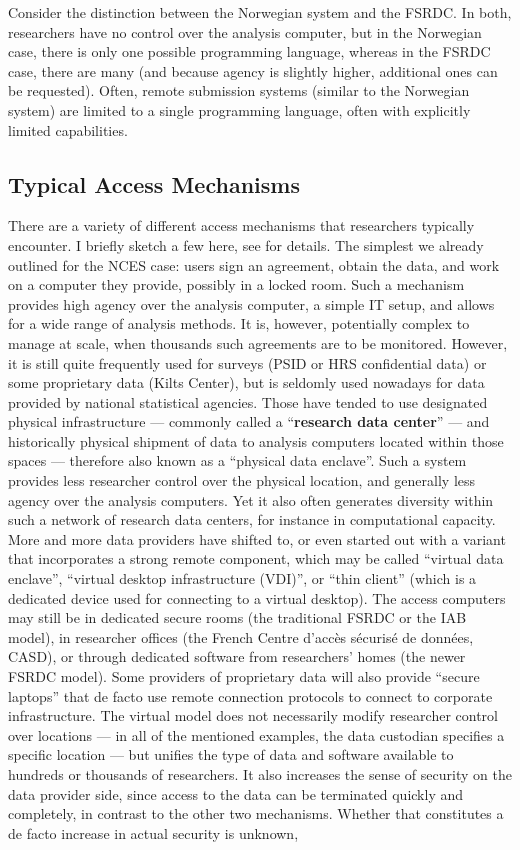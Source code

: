 Consider the distinction between the Norwegian system and the FSRDC. In both, researchers have no control over the analysis computer, but in the Norwegian case, there is only one possible programming language, whereas in the FSRDC case, there are many (and because agency is slightly higher, additional ones can be requested). Often, remote submission systems (similar to the Norwegian system) are limited to a single programming language, often with explicitly limited capabilities. 

\subsection{Typical Access Mechanisms}

There are a variety of different access mechanisms that researchers typically encounter. I briefly sketch a few here, see \cite{shen_physically_2021} for details. The simplest we already outlined for the NCES case: users sign an agreement, obtain the data, and work on a computer they provide, possibly in a locked room. Such a mechanism provides high agency over the analysis computer, a simple IT setup, and allows for a wide range of analysis methods. It is, however, potentially complex to manage at scale, when thousands such agreements are to be monitored. However, it is still quite frequently used for surveys (PSID or HRS confidential data) or some proprietary data (Kilts Center), but is seldomly used nowadays for data provided by national statistical agencies. Those have tended to use designated physical infrastructure --- commonly called a ``\textbf{research data center}'' --- and historically physical shipment of data to analysis computers located within those spaces \cite{currie2015social}  --- therefore also known as a ``physical data enclave''. Such a system provides less researcher control over the physical location, and generally less agency over the analysis computers. Yet it also often generates diversity within such a network of research data centers, for instance in computational capacity. More and more data providers have shifted to, or even started out with a variant that incorporates a strong remote component, which may be called ``virtual data enclave'', ``virtual desktop infrastructure (VDI)'', or ``thin client'' (which is a dedicated device used for connecting to a virtual desktop). The access computers may still be in dedicated secure rooms (the traditional FSRDC or the IAB model), in researcher offices (the French Centre d'accès sécurisé de données, CASD), or through dedicated software from researchers' homes (the newer FSRDC model). Some providers of proprietary data will also provide ``secure laptops'' that de facto use remote connection protocols to connect to corporate infrastructure. The virtual model does not necessarily modify researcher control over locations --- in all of the mentioned examples, the data custodian specifies a specific location --- but unifies the type of data and software available to hundreds or thousands of researchers. It also increases the sense of security on the data provider side, since access to the data can be terminated quickly and completely, in contrast to the other two mechanisms. Whether that constitutes a de facto increase in actual security is unknown, 